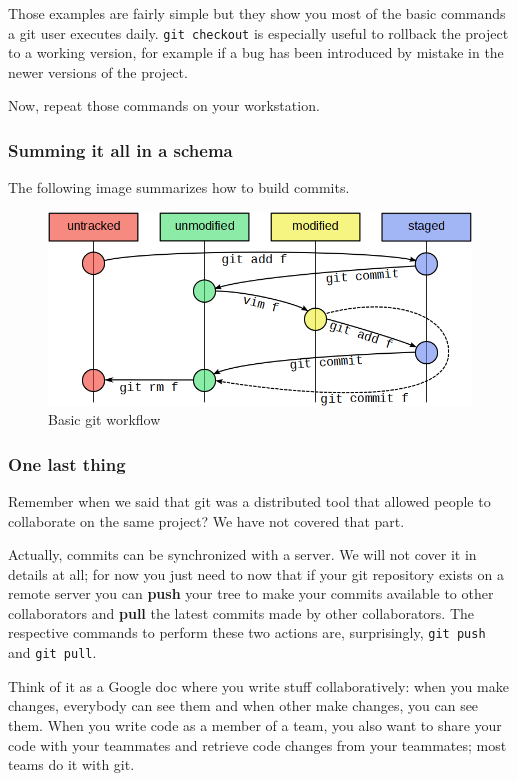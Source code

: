\documentclass[12pt]{article}
\begin{document}
Those examples are fairly simple but they show you most of the basic commands a git user executes daily. \texttt{git checkout} is especially useful to rollback the project to a working version, for example if a bug has been introduced by mistake in the newer versions of the project.

Now, repeat those commands on your workstation.

\subsubsection{Summing it all in a schema}

The following image summarizes how to build commits.

\begin{figure}[!h]\centering\captionsetup{}
   \includegraphics[scale = 0.55]{resources/git_workflow.png}
   \caption{Basic git workflow}
\end{figure}

\subsubsection{One last thing}

Remember when we said that git was a distributed tool that allowed people to collaborate on the same project? We have not covered that part.

Actually, commits can be synchronized with a server. We will not cover it in details at all; for now you just need to now that if your git repository exists on a remote server you can \textbf{push} your tree to make your commits available to other collaborators and \textbf{pull} the latest commits made by other collaborators. The respective commands to perform these two actions are, surprisingly, \texttt{git push} and \texttt{git pull}.

Think of it as a Google doc where you write stuff collaboratively: when you make changes, everybody can see them and when other make changes, you can see them. When you write code as a member of a team, you also want to share your code with your teammates and retrieve code changes from your teammates; most teams do it with git.
\end{document}
